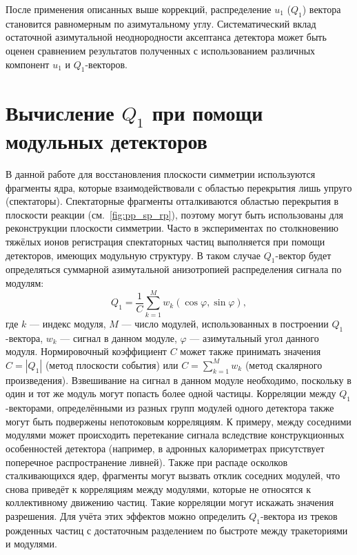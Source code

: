 После применения описанных выше коррекций, распределение $u_1$ ($Q_1$) вектора становится равномерным по азимутальному углу.
Систематический вклад остаточной азимутальной неоднородности аксептанса детектора может быть оценен сравнением результатов полученных с использованием различных компонент $u_1$ и $Q_1$-векторов. 

\section{Вычисление $Q_1$ при помощи модульных детекторов}

В данной работе для восстановления плоскости симметрии используются фрагменты ядра, которые взаимодействовали с областью перекрытия лишь упруго (спектаторы). 
Спектаторные фрагменты отталкиваются областью перекрытия в плоскости реакции (см.~\ref{fig:pp_sp_rp}), поэтому могут быть использованы для реконструкции плоскости симметрии. 
Часто в экспериментах по столкновению тяжёлых ионов регистрация спектаторных частиц выполняется при помощи детекторов, имеющих модульную структуру. 
В таком случае $Q_1$-вектор будет определяться суммарной азимутальной анизотропией распределения сигнала по модулям:
%
\begin{equation}
    Q_1  = \frac{1}{C} \sum_{k=1}^M w_k ( \cos \varphi, \sin \varphi ),
\end{equation}
%
где $k$ --- индекс модуля, $M$ --- число модулей, использованных в построении $Q_1$-вектора, $w_k$ --- сигнал в данном модуле, $\varphi$ --- азимутальный угол данного модуля. 
Нормировочный коэффициент $C$ может также принимать значения $C=|Q_1|$ (метод плоскости события) или $C=\sum_{k=1}^M w_k$ (метод скалярного произведения).
Взвешивание на сигнал в данном модуле необходимо, поскольку в один и тот же модуль могут попасть более одной частицы.
Корреляции между $Q_1$-векторами, определёнными из разных групп модулей одного детектора также могут быть подвержены непотоковым корреляциям.
К примеру, между соседними модулями может происходить перетекание сигнала вследствие конструкционных особенностей детектора (например, в адронных калориметрах присутствует поперечное распространение ливней).
Также при распаде осколков сталкивающихся ядер, фрагменты могут вызвать отклик соседних модулей, что снова приведёт к корреляциям между модулями, которые не относятся к коллективному движению частиц.
Такие корреляции могут искажать значения разрешения.
Для учёта этих эффектов можно определить $Q_1$-вектора из треков рожденных частиц с достаточным разделением по быстроте между тракеториями и модулями.

